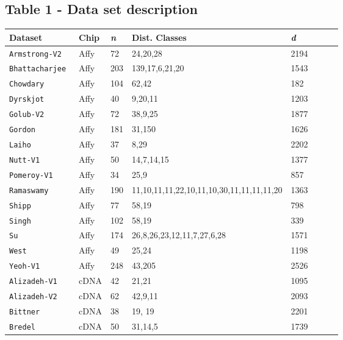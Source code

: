 \documentclass[10pt]{bmc_article}
\newenvironment{bmcformat}{\begin{raggedright}\baselineskip20pt\sloppy\setboolean{publ}{false}}{\end{raggedright}\baselineskip20pt\sloppy}
\begin{document}
\begin{bmcformat}
\subsection*{Table 1 - Data set description}
\begin{table}[htp]
\label{datasete}
\begin{center}
\begin{footnotesize}
\begin{tabular}{llllllll}
  \hline
  \bf{Dataset} & {\bf Chip} & \bf{\it{n}} & \bf{Dist. Classes} & \bf{\it{d}}\\
  \hline
{\tt Armstrong-V2}~\cite{Armstrong2002} & Affy & 72 & 24,20,28 & 2194 \\
{\tt Bhattacharjee}~\cite{Bhattacharjee2001} & Affy & 203 & 139,17,6,21,20 & 1543 \\
{\tt Chowdary}~\cite{Chowdary2006} & Affy & 104 & 62,42 & 182 \\
{\tt Dyrskjot}~\cite{Dyrskjoet2003} & Affy & 40& 9,20,11 & 1203 \\
{\tt Golub-V2}~\cite{Golub1999} & Affy & 72 & 38,9,25 & 1877 \\
{\tt Gordon}~\cite{Gordon2002} & Affy & 181 & 31,150 & 1626 \\
{\tt Laiho}~\cite{Laiho2007c} & Affy & 37 & 8,29 & 2202 \\
{\tt Nutt-V1}~\cite{Nutt2003}& Affy & 50 & 14,7,14,15 &  1377\\
{\tt Pomeroy-V1}~\cite{Pomeroy2002} & Affy & 34 & 25,9 & 857 \\
{\tt Ramaswamy}~\cite{Ramaswamy2001} & Affy & 190 & 11,10,11,11,22,10,11,10,30,11,11,11,11,20 & 1363 \\
{\tt Shipp}~\cite{Shipp2002} & Affy & 77 & 58,19 & 798 \\
{\tt Singh}~\cite{Singh2002b} & Affy & 102 & 58,19 & 339 \\
{\tt Su}~\cite{Su2001} & Affy & 174 & 26,8,26,23,12,11,7,27,6,28 & 1571 \\
{\tt West}~\cite{West2001} & Affy & 49 & 25,24 & 1198\\
{\tt Yeoh-V1}~\cite{Yeoh2002} & Affy & 248 & 43,205 & 2526 \\
{\tt Alizadeh-V1}~\cite{Alizadeh2000} & cDNA & 42 & 21,21 & 1095 \\
{\tt Alizadeh-V2}~\cite{Alizadeh2000} & cDNA & 62 & 42,9,11 & 2093 \\
{\tt Bittner}~\cite{Bittner2000}   & cDNA & 38 &  19, 19 & 2201 \\
{\tt Bredel}~\cite{Bredel2005} & cDNA  & 50 &   31,14,5 & 1739 \\

\end{tabular}
\end{footnotesize}
\end{center}
\end{table}
\end{bmcformat}
\end{document}
